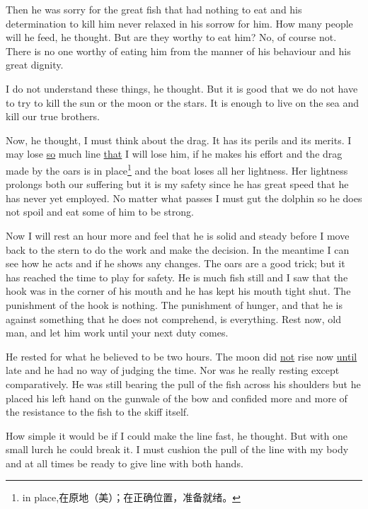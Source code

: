 Then he was sorry for the great fish that had nothing to eat and his
\gls{determination} to kill him never \gls{relaxed} in his \gls{sorrow} for
him. How many people will he feed, he thought. But are they worthy to eat
him? No, of course not. There is no one worthy of eating him from the
\gls{manner} of his \gls{behaviour} and his great \gls{dignity}.

I do not understand these things, he thought. But it is good that we do not
have to try to kill the sun or the moon or the stars. It is enough to live
on the sea and kill our true brothers.

Now, he thought, I must think about the drag. It has its \glspl{peril} and
its \glspl{merit}. I may lose \uline{so} much line \uline{that} I will lose
him, if he makes his effort and the drag made by the oars is in
place\footnote{in place,在原地（美）；在正确位置，准备就绪。} and the boat
loses all her \gls{lightness}. Her lightness \glspl{prolong} both our
suffering but it is my safety since he has great speed that he has never yet
\gls{employed}. No matter what passes I must \gls{gut} the dolphin so he
does not spoil and eat some of him to be strong.

Now I will rest an hour more and feel that he is solid and steady before I
move back to the stern to do the work and make the \gls{decision}. In the
\gls{meantime} I can see how he acts and if he shows any changes. The oars
are a good trick; but it has reached the time to play for safety. He is much
fish still and I saw that the hook was in the corner of his mouth and he has
kept his mouth tight shut. The \gls{punishment} of the hook is nothing. The
punishment of hunger, and that he is against something that he does not
\gls{comprehend}, is everything. Rest now, old man, and let him work until your
next duty comes.

He rested for what he believed to be two hours. The moon did \uline{not} rise
now \uline{until} late and he had no way of \gls{judging} the time. Nor was he
really resting except \gls{comparatively}. He was still \gls{bearing} the
pull of the fish across his shoulders but he placed his left hand on the
gunwale of the bow and \gls{confided} more and more of the \gls{resistance}
to the fish to the skiff itself.

How simple it would be if I could make the line fast, he thought. But with
one small lurch he could break it. I must \gls{cushion} the pull of the line
with my body and at all times be ready to give line with both hands.

